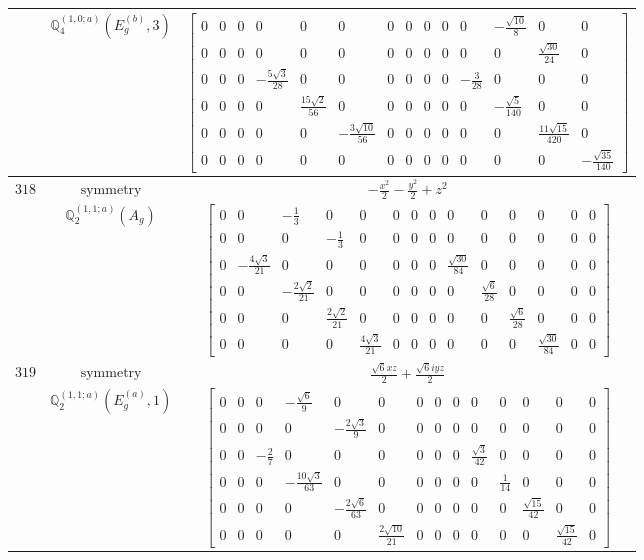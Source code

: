 \documentclass[fleqn,8pt,landscape]{jsarticle}
\begin{document}
\begin{longtable}{ccc}
$  $ & $ \mathbb{Q}_{4}^{(1,0;a)}(E_{g}^{(b)},3) $ & $ \begin{bmatrix} 0 & 0 & 0 & 0 & 0 & 0 & 0 & 0 & 0 & 0 & 0 & - \frac{\sqrt{10}}{8} & 0 & 0 \\ 0 & 0 & 0 & 0 & 0 & 0 & 0 & 0 & 0 & 0 & 0 & 0 & \frac{\sqrt{30}}{24} & 0 \\ 0 & 0 & 0 & - \frac{5 \sqrt{3}}{28} & 0 & 0 & 0 & 0 & 0 & 0 & - \frac{3}{28} & 0 & 0 & 0 \\ 0 & 0 & 0 & 0 & \frac{15 \sqrt{2}}{56} & 0 & 0 & 0 & 0 & 0 & 0 & - \frac{\sqrt{5}}{140} & 0 & 0 \\ 0 & 0 & 0 & 0 & 0 & - \frac{3 \sqrt{10}}{56} & 0 & 0 & 0 & 0 & 0 & 0 & \frac{11 \sqrt{15}}{420} & 0 \\ 0 & 0 & 0 & 0 & 0 & 0 & 0 & 0 & 0 & 0 & 0 & 0 & 0 & - \frac{\sqrt{35}}{140} \end{bmatrix} $ \\ \hline
$ 318 $ & $ \text{symmetry} $ & $ - \frac{x^{2}}{2} - \frac{y^{2}}{2} + z^{2} $ \\
$  $ & $ \mathbb{Q}_{2}^{(1,1;a)}(A_{g}) $ & $ \begin{bmatrix} 0 & 0 & - \frac{1}{3} & 0 & 0 & 0 & 0 & 0 & 0 & 0 & 0 & 0 & 0 & 0 \\ 0 & 0 & 0 & - \frac{1}{3} & 0 & 0 & 0 & 0 & 0 & 0 & 0 & 0 & 0 & 0 \\ 0 & - \frac{4 \sqrt{3}}{21} & 0 & 0 & 0 & 0 & 0 & 0 & \frac{\sqrt{30}}{84} & 0 & 0 & 0 & 0 & 0 \\ 0 & 0 & - \frac{2 \sqrt{2}}{21} & 0 & 0 & 0 & 0 & 0 & 0 & \frac{\sqrt{6}}{28} & 0 & 0 & 0 & 0 \\ 0 & 0 & 0 & \frac{2 \sqrt{2}}{21} & 0 & 0 & 0 & 0 & 0 & 0 & \frac{\sqrt{6}}{28} & 0 & 0 & 0 \\ 0 & 0 & 0 & 0 & \frac{4 \sqrt{3}}{21} & 0 & 0 & 0 & 0 & 0 & 0 & \frac{\sqrt{30}}{84} & 0 & 0 \end{bmatrix} $ \\ \hline
$ 319 $ & $ \text{symmetry} $ & $ \frac{\sqrt{6} x z}{2} + \frac{\sqrt{6} i y z}{2} $ \\
$  $ & $ \mathbb{Q}_{2}^{(1,1;a)}(E_{g}^{(a)},1) $ & $ \begin{bmatrix} 0 & 0 & 0 & - \frac{\sqrt{6}}{9} & 0 & 0 & 0 & 0 & 0 & 0 & 0 & 0 & 0 & 0 \\ 0 & 0 & 0 & 0 & - \frac{2 \sqrt{3}}{9} & 0 & 0 & 0 & 0 & 0 & 0 & 0 & 0 & 0 \\ 0 & 0 & - \frac{2}{7} & 0 & 0 & 0 & 0 & 0 & 0 & \frac{\sqrt{3}}{42} & 0 & 0 & 0 & 0 \\ 0 & 0 & 0 & - \frac{10 \sqrt{3}}{63} & 0 & 0 & 0 & 0 & 0 & 0 & \frac{1}{14} & 0 & 0 & 0 \\ 0 & 0 & 0 & 0 & - \frac{2 \sqrt{6}}{63} & 0 & 0 & 0 & 0 & 0 & 0 & \frac{\sqrt{15}}{42} & 0 & 0 \\ 0 & 0 & 0 & 0 & 0 & \frac{2 \sqrt{10}}{21} & 0 & 0 & 0 & 0 & 0 & 0 & \frac{\sqrt{15}}{42} & 0 \end{bmatrix} $ \\ \hline

\end{longtable}
\end{document}
